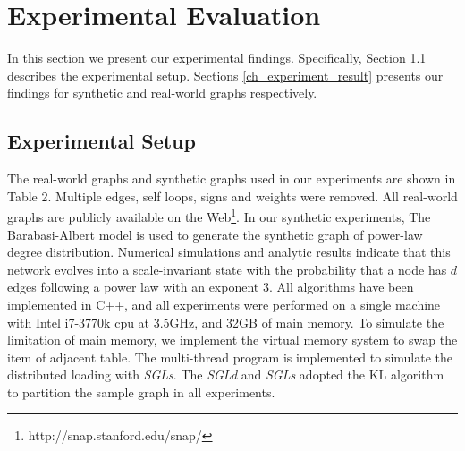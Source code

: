\documentclass{sig-alternate-2013}
\begin{document}
\section{Experimental Evaluation}
In this section we present our experimental findings. Specifically, Section \ref{ch_experiment_setup} describes the experimental setup.
Sections \ref{ch_experiment_result} presents our findings for synthetic and real-world graphs respectively.
\subsection{Experimental Setup}\label{ch_experiment_setup}

The real-world graphs and synthetic graphs used in our experiments are shown in Table 2.
Multiple edges, self loops, signs and weights were removed.
All real-world graphs are publicly available on the Web\footnote{http://snap.stanford.edu/snap/}.
In our synthetic experiments, The Barabasi-Albert model\cite{BA:randomgraph} is used to generate the synthetic graph of power-law degree distribution.
Numerical simulations and analytic results indicate that this network evolves into a scale-invariant state with the probability that a node has $d$ edges following a power law with an exponent 3.
All algorithms have been implemented in C++, and all experiments were performed on a single machine with Intel i7-3770k cpu at 3.5GHz, and 32GB of main memory.
To simulate the limitation of main memory, we implement the virtual memory system to swap the item of adjacent table.
The multi-thread program is implemented to simulate the distributed loading with \textit{SGLs}. The \textit{SGLd} and \textit{SGLs} adopted the KL algorithm to partition the sample graph in all experiments.
\end{document}

